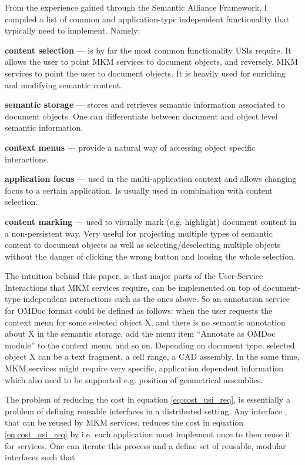 \documentclass{llncs}
\begin{document}
From the experience gained through the Semantic Alliance Framework, I compiled a list of common and application-type independent functionality that  typically need to implement. Namely:
\begin{compactenum}
\item [\bf{content selection}] --- is by far the most common functionality USIs require. It allows the user to point MKM services to document objects, and reversely, MKM services to point the user to document objects. It is heavily used for enriching and modifying semantic content.
\item [\bf{semantic storage}] --- stores and retrieves semantic information associated to document objects. One can differentiate between document and object level semantic information.
\item [\bf{context menus}] --- provide a natural way of accessing object specific interactions. 
\item [\bf{application focus}] --- used in the multi-application context and allows changing focus to a certain application. Is usually used in combination with content selection.
\item [\bf{content marking}] --- used to visually mark (e.g. highlight) document content in a non-persistent way. Very useful for projecting multiple types of semantic content to document objects as well as selecting/deselecting multiple objects without the danger of clicking the wrong button and loosing the whole selection. 
\end{compactenum}
The intuition behind this paper, is that major parts of the User-Service Interactions that MKM services require, can be implemented on top of document-type independent interactions such as the ones above. So an annotation service for OMDoc format could be defined as follows: when the user requests the context menu for some selected object X, and there is no semantic annotation about X in the semantic storage, add the menu item ``Annotate as OMDoc module'' to the context menu, and so on. Depending on document type, selected object X can be a text fragment, a cell range, a CAD assembly. In the same time, MKM services might require very specific, application dependent information which also need to be supported e.g. position of geometrical assemblies. 

The problem of reducing the cost in equation \ref{eq:cost_usi_req}, is essentially a problem of defining reusable interfaces in a distributed setting. Any interface , that can be reused by  MKM services, reduces the cost in equation \ref{eq:cost_usi_req} by  i.e. each application must implement  once to then reuse it for  services. One can iterate this process and a define set of reusable, modular interfaces  such that 
\end{document}
